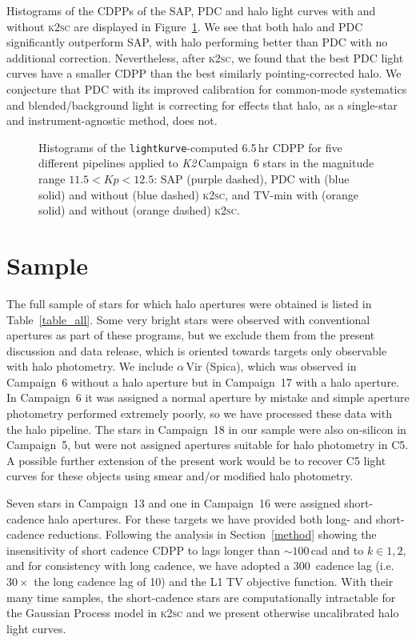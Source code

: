 \documentclass[modern]{aastex62}
\newcommand\ktwo{\emph{K2}\,}
\begin{document}
Histograms of the CDPPs of the SAP, PDC and halo light curves with and without \textsc{k2sc} are displayed in Figure~\ref{fig:cdpphists}. We see that both halo and PDC significantly outperform SAP, with halo performing better than PDC with no additional correction. Nevertheless, after \textsc{k2sc}, we found that the best PDC light curves have a smaller CDPP than the best similarly pointing-corrected halo. We conjecture that PDC with its improved calibration for common-mode systematics and blended/background light is correcting for effects that halo, as a single-star and instrument-agnostic method, does not.

\begin{figure}
\caption{Histograms of the \texttt{lightkurve}-computed 6.5\,hr CDPP for five different pipelines applied to \ktwo Campaign~6 stars in the magnitude range $11.5 < Kp < 12.5$: SAP (purple dashed), PDC with (blue solid) and without (blue dashed) \textsc{k2sc}, and TV-min with (orange solid) and without (orange dashed) \textsc{k2sc}.}
\label{fig:cdpphists}
\end{figure}


\section{Sample}
\label{sec:sample}


The full sample of stars for which halo apertures were obtained is listed in Table~\ref{table_all}. Some very bright stars were observed with conventional apertures as part of these programs, but we exclude them from the present discussion and data release, which is oriented towards targets only observable with halo photometry. 
We include $\alpha$\,Vir (Spica), which was observed in Campaign~6 without a halo aperture but in Campaign~17 with a halo aperture. In Campaign~6 it was assigned a normal aperture by mistake and simple aperture photometry performed extremely poorly, so we have processed these data with the halo pipeline. The stars in Campaign~18 in our sample were also on-silicon in Campaign~5, but were not assigned apertures suitable for halo photometry in C5. A possible further extension of the present work would be to recover C5 light curves for these objects using smear and/or modified halo photometry.

Seven stars in Campaign~13 and one in Campaign~16 were assigned short-cadence halo apertures. For these targets we have provided both long- and short-cadence reductions. Following the analysis in Section~\ref{method} showing the insensitivity of short cadence CDPP to lags longer than $\sim 100$\,cad and to $k \in {1,2}$, and for consistency with long cadence, we have adopted a 300~cadence lag (i.e. $30 \times$ the long cadence lag of 10) and the L1 TV objective function. With their many time samples, the short-cadence stars are computationally intractable for the Gaussian Process model in \textsc{k2sc} and we present otherwise uncalibrated halo light curves.
\end{document}
